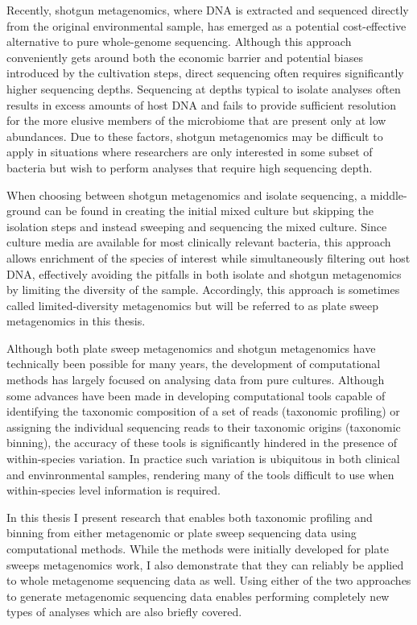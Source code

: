 \documentclass[officiallayout]{tktla}
\begin{document}
Recently, shotgun metagenomics, where DNA is extracted and sequenced
directly from the original environmental sample, has emerged as a
potential cost-effective alternative to pure whole-genome
sequencing. Although this approach conveniently gets around both the
economic barrier and potential biases introduced by the cultivation
steps, direct sequencing often requires significantly higher
sequencing depths. Sequencing at depths typical to isolate analyses
often results in excess amounts of host DNA and fails to provide
sufficient resolution for the more elusive members of the microbiome
that are present only at low abundances. Due to these factors, shotgun
metagenomics may be difficult to apply in situations where researchers
are only interested in some subset of bacteria but wish to perform
analyses that require high sequencing depth.

When choosing between shotgun metagenomics and isolate sequencing, a
middle-ground can be found in creating the initial mixed culture but
skipping the isolation steps and instead sweeping and sequencing the
mixed culture. Since culture media are available for most clinically
relevant bacteria, this approach allows enrichment of the species of
interest while simultaneously filtering out host DNA, effectively
avoiding the pitfalls in both isolate and shotgun metagenomics by
limiting the diversity of the sample. Accordingly, this approach is
sometimes called limited-diversity metagenomics
\citep{cocker_drivers_2022} but will be referred to as plate sweep
metagenomics in this thesis.

Although both plate sweep metagenomics and shotgun metagenomics
have technically been possible for many years, the development of
computational methods has largely focused on analysing data from pure
cultures. Although some advances have been made in developing
computational tools capable of identifying the taxonomic composition
of a set of reads (taxonomic profiling) or assigning the individual
sequencing reads to their taxonomic origins (taxonomic binning), the
accuracy of these tools is significantly hindered in the presence of
within-species variation. In practice such variation is ubiquitous in
both clinical and envinronmental samples, rendering many of the tools
difficult to use when within-species level information is required.

In this thesis I present research that enables both taxonomic
profiling and binning from either metagenomic or plate sweep
sequencing data using computational methods. While the methods were
initially developed for plate sweeps metagenomics work, I also
demonstrate that they can reliably be applied to whole metagenome
sequencing data as well. Using either of the two approaches to
generate metagenomic sequencing data enables performing completely new
types of analyses which are also briefly covered.
\end{document}
